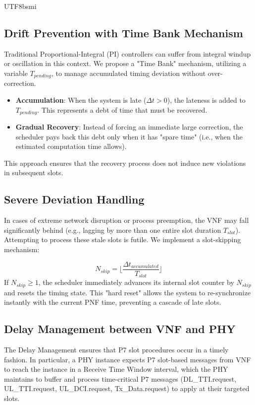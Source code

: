 \documentclass[conference]{IEEEtran}
\begin{document}
\begin{CJK}{UTF8}{bsmi}
{\subsection{Drift Prevention with Time Bank Mechanism}
Traditional Proportional-Integral (PI) controllers can suffer from integral windup or oscillation in this context. We propose a "Time Bank" mechanism, utilizing a variable $T_{pending}$, to manage accumulated timing deviation without over-correction.
\begin{itemize}
    \item \textbf{Accumulation}: When the system is late ($\Delta t > 0$), the lateness is added to $T_{pending}$. This represents a debt of time that must be recovered.
    \item \textbf{Gradual Recovery}: Instead of forcing an immediate large correction, the scheduler pays back this debt only when it has "spare time" (i.e., when the estimated computation time allows).
\end{itemize}
This approach ensures that the recovery process does not induce new violations in subsequent slots.

\subsection{Severe Deviation Handling}
In cases of extreme network disruption or process preemption, the VNF may fall significantly behind (e.g., lagging by more than one entire slot duration $T_{slot}$). Attempting to process these stale slots is futile.
We implement a slot-skipping mechanism:
}
\begin{equation}
    N_{skip} = \lfloor \frac{\Delta t_{accumulated}}{T_{slot}} \rfloor
\end{equation}
{\color{blue}
If $N_{skip} \ge 1$, the scheduler immediately advances its internal slot counter by $N_{skip}$ and resets the timing state. This "hard reset" allows the system to re-synchronize instantly with the current PNF time, preventing a cascade of late slots.
}

{\color{blue}
\subsection{Delay Management between VNF and PHY}
The Delay Management ensures that P7 slot procedures occur in a timely fashion. In particular, a PHY instance expects P7 slot-based messages from VNF to reach the instance in a Receive Time Window interval, which the PHY maintains to buffer and process time-critical P7 messages (DL\_TTI.request, UL\_TTI.request, UL\_DCI.request, Tx\_Data.request) to apply at their targeted slots.

}
\end{CJK}
\end{document}
